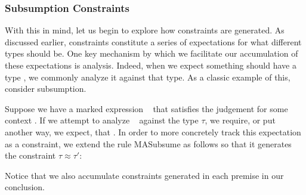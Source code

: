 

\subsubsection{Subsumption Constraints}
With this in mind, let us begin to explore how constraints are generated. As discussed earlier, constraints constitute a series of expectations for what different types should be. One key mechanism by which we facilitate our accumulation of these expectations is analysis. Indeed, when we expect something should have a type \TMV, we commonly analyze it against that type. As a classic example of this, consider subsumption. 

Suppose we have a marked expression \ECMV~ that satisfies the judgement  for some context \ctx. If we attempt to analyze \ECMV~ against the type $\tau$, we require, or put another way, we expect, that . In order to more concretely track this expectation as a constraint, we extend the rule MASubsume  as follows so that it generates the constraint $\tau \approx \tau'$:
\begin{mathpar}
\end{mathpar}
Notice that we also accumulate constraints generated in each premise in our conclusion.

